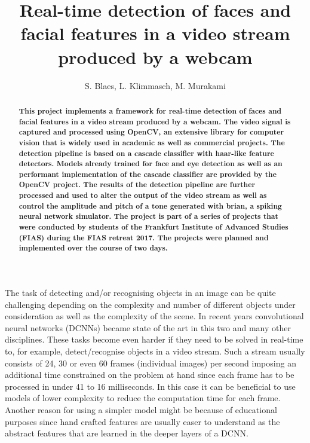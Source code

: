 \documentclass[11pt,a4paper]{article}
\begin{document}
\title{Real-time detection of faces and facial features in a video stream produced by a webcam}
\author{S. Blaes, L. Klimmasch, M. Murakami}
\date{}

\maketitle

\begin{abstract}
\bfseries{
\noindent This project implements a framework for real-time detection of faces and facial features in a video stream produced by a webcam. The video signal is captured and processed using OpenCV, an extensive library for computer vision that is widely used in academic as well as commercial projects. The detection pipeline is based on a cascade classifier with haar-like feature detectors. Models already trained for face and eye detection as well as an performant implementation of the cascade classifier are provided by the OpenCV project. The results of the detection pipeline are further processed and used to alter the output of the video stream as well as control the amplitude and pitch of a tone generated with brian, a spiking neural network simulator. The project is part of a series of projects that were conducted by students of the Frankfurt Institute of Advanced Studies (FIAS) during the FIAS retreat 2017. The projects were planned and implemented over the course of two days. 
}
\end{abstract}

\vspace{1.5cm}

The task of detecting and/or recognising objects in an image can be quite challenging depending on the complexity and number of different objects under consideration as well as the complexity of the scene. In recent years convolutional neural networks (DCNNs) became state of the art in this two and many other disciplines. These tasks become even harder if they need to be solved in real-time to, for example, detect/recognise objects in a video stream. Such a stream usually consists of 24, 30 or even 60 frames (individual images) per second imposing an additional time constrained on the problem at hand since each frame has to be processed in under 41 to 16 milliseconds. In this case it can be beneficial to use models of lower complexity to reduce the computation time for each frame. Another reason for using a simpler model might be because of educational purposes since hand crafted features are usually easer to understand as the abstract features that are learned in the deeper layers of a DCNN. 
\end{document}
